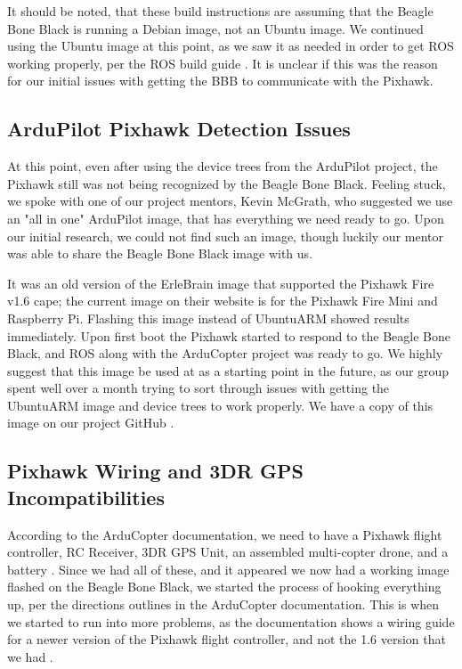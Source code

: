 \documentclass[IEEEtran,letterpaper,10pt,notitlepage,draftclsnofoot]{article}
\begin{document}
It should be noted, that these build instructions are assuming that the Beagle Bone Black is running a Debian
image, not an Ubuntu image. We continued using the Ubuntu image at this point, as we saw it as needed in order
to get ROS working properly, per the ROS build guide \cite{ROSBBBUbuntu}. It is unclear if
this was the reason for our initial issues with getting the BBB to communicate with the Pixhawk.

\subsection{ArduPilot Pixhawk Detection Issues}

At this point, even after using the device trees from the ArduPilot project, the Pixhawk still was not being
recognized by the Beagle Bone Black. Feeling stuck, we spoke with one of our project mentors, Kevin McGrath,
who suggested we use an "all in one" ArduPilot image, that has everything we need ready to go.
Upon our initial research, we could not find such an image, though luckily our mentor was able to share the
Beagle Bone Black image with us.

It was an old version of the ErleBrain image that supported the Pixhawk Fire v1.6 cape; the current image on
their website is for the Pixhawk Fire Mini and Raspberry Pi. Flashing this image instead of UbuntuARM showed
results immediately. Upon first boot the Pixhawk started to respond to the Beagle Bone Black, and ROS along
with the ArduCopter project was ready to go. We highly suggest that this image be used at as a starting point
in the future, as our group spent well over a month trying to sort through issues with getting the UbuntuARM
image and device trees to work properly. We have a copy of this image on our project GitHub \cite{ErleBrainAIOImage}.

\subsection{Pixhawk Wiring and 3DR GPS Incompatibilities}

According to the ArduCopter documentation, we need to have a Pixhawk flight controller, RC Receiver, 3DR GPS
Unit, an assembled multi-copter drone, and a battery \cite{ArduCopterIntro}.
Since we had all of these, and it appeared we now had a working image flashed on the Beagle Bone Black, we
started the process of hooking everything up, per the directions outlines in
the ArduCopter documentation. This is when we started to run into more problems, as the documentation shows a
wiring guide for a newer version of the Pixhawk flight controller, and not the 1.6 version that we had
\cite{ArduPixhawkWiring}.
\end{document}
